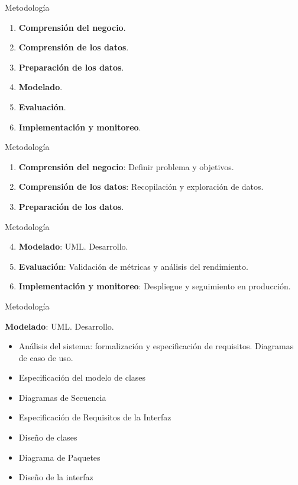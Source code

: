\documentclass{beamer}
\begin{document}
\begin{frame}{Metodología}
  \begin{enumerate}
    \item \textbf{Comprensión del negocio}.
    \item \textbf{Comprensión de los datos}.
    \item \textbf{Preparación de los datos}.
    \item \textbf{Modelado}.
    \item \textbf{Evaluación}.
    \item \textbf{Implementación y monitoreo}.
  \end{enumerate}
\end{frame}


\begin{frame}{Metodología}
  \begin{enumerate}
    \item \textbf{Comprensión del negocio}: Definir  problema y objetivos.
    \item \textbf{Comprensión de los datos}: Recopilación y exploración de datos.
    \item \textbf{Preparación de los datos}.
  \end{enumerate}
\end{frame}


\begin{frame}{Metodología}
  \begin{enumerate}
    \setcounter{enumi}{3}
    \item \textbf{Modelado}: UML. Desarrollo.
    \item \textbf{Evaluación}: Validación de métricas y análisis del rendimiento.
    \item \textbf{Implementación y monitoreo}: Despliegue y seguimiento en producción.
  \end{enumerate}
\end{frame}

\begin{frame}{Metodología}
  \begin{center}
    \textbf{Modelado}: UML. Desarrollo.
    \begin{itemize}
      \item Análisis del sistema: formalización y especificación de requisitos. Diagramas de caso de uso.
      \item Especificación del modelo de clases
      \item Diagramas de Secuencia
      \item Especificación de Requisitos de la Interfaz
      \item Diseño de clases
      \item Diagrama de Paquetes
      \item Diseño de la interfaz
    \end{itemize}
  \end{center}
\end{frame}
\end{document}
